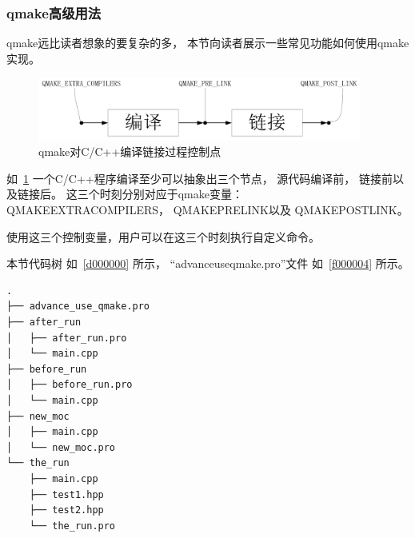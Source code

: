\FloatBarrier
\subsubsection{
qmake高级用法
}\label{ss000810}


qmake远比读者想象的要复杂的多，
本节向读者展示一些常见功能如何使用qmake实现。


\begin{figure}[ht] %
\centering %
\includegraphics[width=0.95\textwidth]{chapter01/images/advance_use_qmake.png} %
\caption{qmake对C/C{\sourcefonttwo{}+}{\sourcefonttwo{}+}编译链接过程控制点} %
\label{p000002} %
\end{figure}


如\figurename\ \ref{p000002}
一个C/C{\sourcefonttwo{}+}{\sourcefonttwo{}+}程序编译至少可以抽象出三个节点，
源代码编译前，
链接前以及链接后。
这三个时刻分别对应于qmake变量：
QMAKE\underline{\hspace{0.5em}}EXTRA\underline{\hspace{0.5em}}COMPILERS，
QMAKE\underline{\hspace{0.5em}}PRE\underline{\hspace{0.5em}}LINK以及
QMAKE\underline{\hspace{0.5em}}POST\underline{\hspace{0.5em}}LINK。

使用这三个控制变量，用户可以在这三个时刻执行自定义命令。

本节代码树
如\treeindexnumbernameone\ \ref{d000000}
所示，
“advance\underline{\hspace{0.5em}}use\underline{\hspace{0.5em}}qmake.pro”文件
如\lstlistingname\ \ref{f000004}
所示。

\label{d000000}    %
\begin{lstlisting}[caption=GoodLuck,
numbers=none,
title=\treeindexnumbernameone \thetreeindexnumber
]
.
├── advance_use_qmake.pro
├── after_run
│   ├── after_run.pro
│   └── main.cpp
├── before_run
│   ├── before_run.pro
│   └── main.cpp
├── new_moc
│   ├── main.cpp
│   └── new_moc.pro
└── the_run
    ├── main.cpp
    ├── test1.hpp
    ├── test2.hpp
    └── the_run.pro
\end{lstlisting}          %

